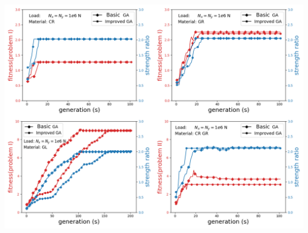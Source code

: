 \documentclass[smallextended]{svjour3}       %
\begin{document}
\begin{center}
  \includegraphics[width=\linewidth]{A_laminate_design_images/NxNy.png}
  \label{fig:NxNy}
\end{center}
\end{document}
